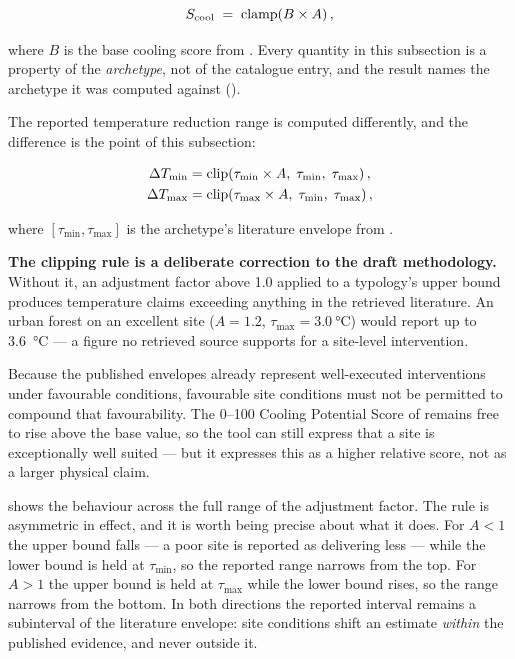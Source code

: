 \begin{equation}
\label{eq:cps}
S_{\mathrm{cool}} \;=\; \operatorname{clamp}\!\left(B \times A\right),
\end{equation}

where $B$ is the base cooling score from . Every
quantity in this subsection is a property of the \emph{archetype}, not of the
catalogue entry, and the result names the archetype it was computed against
().

The reported temperature reduction range is computed differently, and the
difference is the point of this subsection:

\begin{align}
\label{eq:dtmin}
\Delta T_{\min} &= \operatorname{clip}\!\left(\tau_{\min} \times A,\;\tau_{\min},\;\tau_{\max}\right), \\
\label{eq:dtmax}
\Delta T_{\max} &= \operatorname{clip}\!\left(\tau_{\max} \times A,\;\tau_{\min},\;\tau_{\max}\right),
\end{align}

where $[\tau_{\min}, \tau_{\max}]$ is the archetype's literature envelope from
.

\begin{keynote}
\noindent\textbf{The clipping rule is a deliberate correction to the draft
methodology.} Without it, an adjustment factor above 1.0 applied to a
typology's upper bound produces temperature claims exceeding anything in the
retrieved literature. An urban forest on an excellent site
($A = 1.2$, $\tau_{\max} = \qty{3.0}{\degreeCelsius}$) would report up to
\qty{3.6}{\degreeCelsius} --- a figure no retrieved source supports for a
site-level intervention.

Because the published envelopes already represent well-executed interventions
under favourable conditions, favourable site conditions must not be permitted
to compound that favourability. The \numrange{0}{100} Cooling Potential Score
of  remains free to rise above the base value, so the tool can
still express that a site is exceptionally well suited --- but it expresses
this as a higher relative score, not as a larger physical claim.
\end{keynote}

 shows the behaviour across the full range of the adjustment
factor. The rule is asymmetric in effect, and it is worth being precise about
what it does. For $A < 1$ the upper bound falls --- a poor site is reported as
delivering less --- while the lower bound is held at $\tau_{\min}$, so the
reported range narrows from the top. For $A > 1$ the upper bound is held at
$\tau_{\max}$ while the lower bound rises, so the range narrows from the
bottom. In both directions the reported interval remains a subinterval of the
literature envelope: site conditions shift an estimate \emph{within} the
published evidence, and never outside it.

